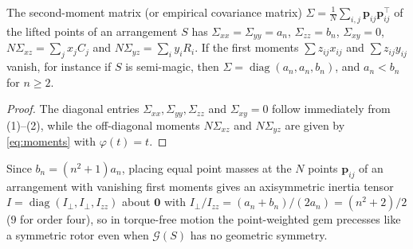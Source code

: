 \begin{lemma}
\label{lem:cov}
The second-moment matrix (or empirical covariance matrix) $\Sigma=\frac1N\sum_{i,j}\mathbf p_{ij}\mathbf p_{ij}^{\top}$ of the lifted points of an arrangement $S$ has $\Sigma_{xx}=\Sigma_{yy}=a_n$, $\Sigma_{zz}=b_n$, $\Sigma_{xy}=0$, $N\Sigma_{xz}=\sum_jx_jC_j$ and $N\Sigma_{yz}=\sum_iy_iR_i$. If the first moments $\sum z_{ij}x_{ij}$ and $\sum z_{ij}y_{ij}$ vanish, for instance if $S$ is semi-magic, then $\Sigma=\operatorname{diag}(a_n,a_n,b_n)$, and $a_n<b_n$ for $n\ge2$.
\end{lemma}

\begin{proof}
The diagonal entries $\Sigma_{xx},\Sigma_{yy},\Sigma_{zz}$ and $\Sigma_{xy}=0$ follow immediately from (1)--(2), while the off-diagonal moments $N\Sigma_{xz}$ and $N\Sigma_{yz}$ are given by \eqref{eq:moments} with $\varphi(t)=t$.
\end{proof}

Since $b_n=(n^2+1)a_n$, placing equal point masses at the $N$ points $\mathbf p_{ij}$ of an arrangement with vanishing first moments gives an axisymmetric inertia tensor $I=\operatorname{diag}(I_\perp,I_\perp,I_{zz})$ about $\mathbf 0$ with $I_\perp/I_{zz}=(a_n+b_n)/(2a_n)=(n^2+2)/2$ ($9$ for order four), so in torque-free motion the point-weighted gem precesses like a symmetric rotor even when $\mathcal G(S)$ has no geometric symmetry.

